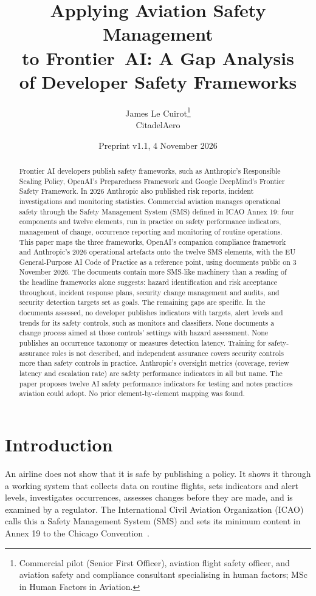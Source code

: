 \documentclass[11pt]{article}
\title{Applying Aviation Safety Management\\ to Frontier~AI: A Gap Analysis\\ of Developer Safety Frameworks}
\author{James Le Cuirot\thanks{Commercial pilot (Senior First Officer), aviation flight safety officer, and aviation safety and compliance consultant specialising in human factors; MSc in Human Factors in Aviation.}\\[2pt] \normalsize CitadelAero}
\date{Preprint v1.1, 4 November 2026}
\begin{document}
\maketitle

\begin{abstract}
Frontier AI developers publish safety frameworks, such as Anthropic's Responsible Scaling Policy, OpenAI's Preparedness Framework and Google DeepMind's Frontier Safety Framework. In 2026 Anthropic also published risk reports, incident investigations and monitoring statistics. Commercial aviation manages operational safety through the Safety Management System (SMS) defined in ICAO Annex 19: four components and twelve elements, run in practice on safety performance indicators, management of change, occurrence reporting and monitoring of routine operations. This paper maps the three frameworks, OpenAI's companion compliance framework and Anthropic's 2026 operational artefacts onto the twelve SMS elements, with the EU General-Purpose AI Code of Practice as a reference point, using documents public on 3 November 2026. The documents contain more SMS-like machinery than a reading of the headline frameworks alone suggests: hazard identification and risk acceptance throughout, incident response plans, security change management and audits, and security detection targets set as goals. The remaining gaps are specific. In the documents assessed, no developer publishes indicators with targets, alert levels and trends for its safety controls, such as monitors and classifiers. None documents a change process aimed at those controls' settings with hazard assessment. None publishes an occurrence taxonomy or measures detection latency. Training for safety-assurance roles is not described, and independent assurance covers security controls more than safety controls in practice. Anthropic's oversight metrics (coverage, review latency and escalation rate) are safety performance indicators in all but name. The paper proposes twelve AI safety performance indicators for testing and notes practices aviation could adopt. No prior element-by-element mapping was found.
\end{abstract}

\section{Introduction}\label{sec:intro}

An airline does not show that it is safe by publishing a policy. It shows it through a working system that collects data on routine flights, sets indicators and alert levels, investigates occurrences, assesses changes before they are made, and is examined by a regulator. The International Civil Aviation Organization (ICAO) calls this a Safety Management System (SMS) and sets its minimum content in Annex 19 to the Chicago Convention~\cite{icao2016annex19}.
\end{document}
